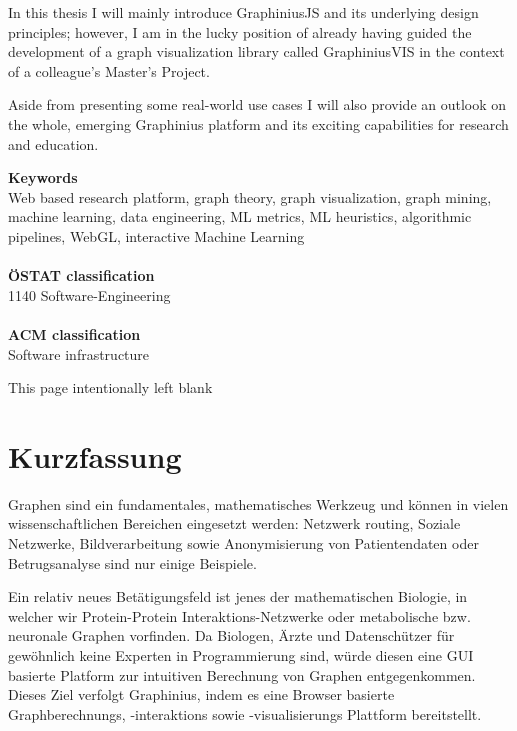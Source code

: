 In this thesis I will mainly introduce GraphiniusJS and its underlying design principles; however, I am in the lucky position of already having guided the development of a graph visualization library called GraphiniusVIS in the context of a colleague's Master's Project.

Aside from presenting some real-world use cases I will also provide an outlook on the whole, emerging Graphinius platform and its exciting capabilities for research and education.



\vfill
\noindent
\textbf{Keywords}\\
Web based research platform, graph theory, graph visualization, graph mining, machine learning, data engineering, ML metrics, ML heuristics, algorithmic pipelines, WebGL, interactive Machine Learning \\
\\
\textbf{ÖSTAT classification}\\
1140 Software-Engineering\\
\\
\textbf{ACM classification}\\
Software infrastructure

\clearpage
\begin{center}
This page intentionally left blank
\end{center}
\clearpage



\section*{Kurzfassung}

Graphen sind ein fundamentales, mathematisches Werkzeug und können in vielen wissenschaftlichen Bereichen eingesetzt werden: Netzwerk routing, Soziale Netzwerke, Bildverarbeitung sowie Anonymisierung von Patientendaten oder Betrugsanalyse sind nur einige Beispiele.

Ein relativ neues Betätigungsfeld ist jenes der mathematischen Biologie, in welcher wir Protein-Protein Interaktions-Netzwerke oder metabolische bzw. neuronale Graphen vorfinden. Da Biologen, Ärzte und Datenschützer für gewöhnlich keine Experten in Programmierung sind, würde diesen eine GUI basierte Platform zur intuitiven Berechnung von Graphen entgegenkommen. Dieses Ziel verfolgt Graphinius, indem es eine Browser basierte Graphberechnungs, -interaktions sowie -visualisierungs Plattform bereitstellt.

